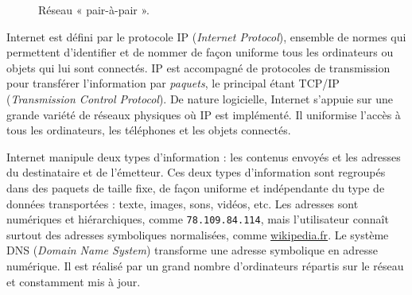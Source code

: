 {\begin{subfigure}{\linewidth}
\caption{\label{fig:IX.1b}Réseau « pair-à-pair ».}
\end{subfigure}
}





\begin{tcolorbox}[title={Protocole TCP/IP}, toprule=0pt, leftrule=0pt, rightrule=0pt, arc=0pt,
                  fonttitle=\scshape\boxtitlefont,
                  colbacktitle=white, coltitle=firstcolor, colframe=firstcolor, colback=firstcolor!10,
                  breakable, enhanced jigsaw]
Internet est défini par le protocole IP (\textit{Internet Protocol}), ensemble de normes qui permettent d’identifier et de nommer de façon uniforme tous les ordinateurs ou objets qui lui sont connectés. IP est accompagné de protocoles de transmission pour transférer l’information par \emph{paquets}, le principal étant TCP/IP (\textit{Transmission Control Protocol}). De nature logicielle, Internet s’appuie sur une grande variété de réseaux physiques où IP est implémenté. Il uniformise l’accès à tous les ordinateurs, les téléphones et les objets connectés.
\end{tcolorbox}

\begin{tcolorbox}[title={Données et information}, toprule=0pt, leftrule=0pt, rightrule=0pt, arc=0pt,
                  fonttitle=\scshape\boxtitlefont,
                  colbacktitle=white, coltitle=firstcolor, colframe=firstcolor, colback=firstcolor!10,
                  breakable, enhanced jigsaw]
Internet manipule deux types d’information : les contenus envoyés et les adresses du destinataire et de l’émetteur. Ces deux types d’information sont regroupés dans des paquets de taille fixe, de façon uniforme et indépendante du type de données transportées : texte, images, sons, vidéos, etc. Les adresses sont numériques et hiérarchiques, comme \texttt{78.109.84.114}, mais l’utilisateur connaît surtout des adresses symboliques normalisées, comme \url{wikipedia.fr}. Le système DNS (\textit{Domain Name System}) transforme une adresse symbolique en adresse numérique. Il est réalisé par un grand nombre d’ordinateurs répartis sur le réseau et constamment mis à jour.
\end{tcolorbox}

